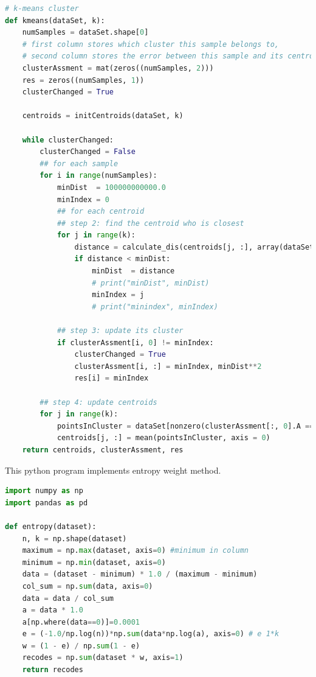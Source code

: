 \documentclass[12pt]{article}
\begin{document}
\begin{appendices}
\begin{lstlisting}[language={python}, caption=\texttt{k-means.py}]
# k-means cluster
def kmeans(dataSet, k):
	numSamples = dataSet.shape[0]
	# first column stores which cluster this sample belongs to,
	# second column stores the error between this sample and its centroid
	clusterAssment = mat(zeros((numSamples, 2)))
	res = zeros((numSamples, 1))
	clusterChanged = True

	centroids = initCentroids(dataSet, k)

	while clusterChanged:
		clusterChanged = False
		## for each sample
		for i in range(numSamples):
			minDist  = 100000000000.0
			minIndex = 0
			## for each centroid
			## step 2: find the centroid who is closest
			for j in range(k):
				distance = calculate_dis(centroids[j, :], array(dataSet[i])[0]) #convert to array
				if distance < minDist:
					minDist  = distance
					# print("minDist", minDist)
					minIndex = j
					# print("minindex", minIndex)
			
			## step 3: update its cluster
			if clusterAssment[i, 0] != minIndex:
				clusterChanged = True
				clusterAssment[i, :] = minIndex, minDist**2
				res[i] = minIndex

		## step 4: update centroids
		for j in range(k):
			pointsInCluster = dataSet[nonzero(clusterAssment[:, 0].A == j)[0]]
			centroids[j, :] = mean(pointsInCluster, axis = 0)
	return centroids, clusterAssment, res
\end{lstlisting}

This python program implements entropy weight method.
\begin{lstlisting}[language={python}, caption=\texttt{entropy-weight.py}]
import numpy as np
import pandas as pd

def entropy(dataset):
    n, k = np.shape(dataset)
    maximum = np.max(dataset, axis=0) #minimum in column
    minimum = np.min(dataset, axis=0)
    data = (dataset - minimum) * 1.0 / (maximum - minimum)
    col_sum = np.sum(data, axis=0)
    data = data / col_sum
    a = data * 1.0
    a[np.where(data==0)]=0.0001
    e = (-1.0/np.log(n))*np.sum(data*np.log(a), axis=0) # e 1*k
    w = (1 - e) / np.sum(1 - e)
    recodes = np.sum(dataset * w, axis=1)
    return recodes
\end{lstlisting}
% 



\end{appendices}
\end{document}
